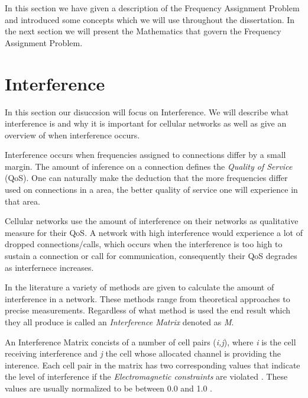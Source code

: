 In this section we have given a description of the Frequency Assignment Problem and introduced some concepts which we will use throughout the dissertation. In the next section we will present the 
Mathematics that govern the Frequency Assignment Problem.
\section{Interference}
In this section our disuccsion will focus on Interference. We will describe what interference is and why it is important for cellular networks as well as give an overview of when interference occurs.

Interference occurs when frequencies assigned to connections differ by a small margin. The amount of inference on a connection defines the \emph{Quality of Service} (QoS). One can naturally make the deduction that the more frequencies differ used on connections in a area, the better quality of service one will experience in that area. 

Cellular networks use the amount of interference on their networks as qualitative measure for their QoS. A network with high interference would experience a lot of dropped connections/calls, which occurs when the interference is too high to sustain a connection or call for communication, consequently their QoS degrades as interfernece increases.

In the literature a variety of methods are given to calculate the amount of interference in a network. These methods range from theoretical approaches to precise measurements. Regardless of what method is used the end result which they all produce is called an \emph{Interference Matrix} denoted as \emph{M}\cite{ACOvsEA}.

An Interference Matrix concists of a number of cell pairs (\emph{i,j}), where \emph{i} is the cell receiving interference and \emph{j} the cell whose allocated channel is providing the interence. Each cell pair in the matrix has two corresponding values that indicate the level of interference if the \emph{Electromagnetic constraints} are violated \cite{Eisenblatter,Karen2004,ACOvsEA}. These values are usually normalized to be between 0.0 and 1.0 \cite{AndreasPaper}.

